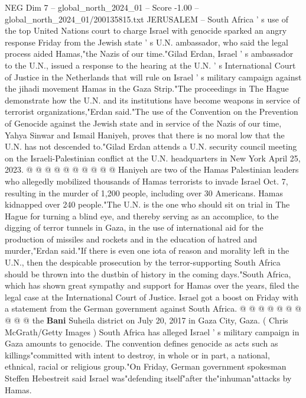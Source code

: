 \begin{textsample}{NEG Dim 7 – global\_north\_2024\_01 – Score -1.00 – global\_north\_2024\_01/200135815.txt}  \label{ex:f7_neg_263}
JERUSALEM -- South Africa ' s use of the top United Nations court to charge Israel with genocide sparked an angry response Friday from the Jewish state ' s U.N. ambassador, who said the legal process aided Hamas,"the Nazis of our time."Gilad Erdan, Israel ' s ambassador to the U.N., issued a response to the hearing at the U.N. ' s International Court of Justice in the Netherlands that will rule on Israel ' s military campaign against the jihadi movement Hamas in the Gaza Strip."The proceedings in The Hague demonstrate how the U.N. and its institutions have become weapons in service of terrorist organizations,"Erdan said."The use of the Convention on the Prevention of Genocide against the Jewish state and in service of the Nazis of our time, Yahya Sinwar and Ismail Haniyeh, proves that there is no moral low that the U.N. has not descended to."Gilad Erdan attends a U.N. security council meeting on the Israeli-Palestinian conflict at the U.N. headquarters in New York April 25, 2023. @ @ @ @ @ @ @ @ @ @ Haniyeh are two of the Hamas Palestinian leaders who allegedly mobilized thousands of Hamas terrorists to invade Israel Oct. 7, resulting in the murder of 1,200 people, including over 30 Americans.
Hamas kidnapped over 240 people."The U.N. is the one who should sit on trial in The Hague for turning a blind eye, and thereby serving as an accomplice, to the digging of terror tunnels in Gaza, in the use of international aid for the production of missiles and rockets and in the education of hatred and murder,"Erdan said."If there is even one iota of reason and morality left in the U.N., then the despicable prosecution by the terror-supporting South Africa should be thrown into the dustbin of history in the coming days."South Africa, which has shown great sympathy and support for Hamas over the years, filed the legal case at the International Court of Justice.
Israel got a boost on Friday with a statement from the German government against South Africa. @ @ @ @ @ @ @ @ @ @ the \textbf{Bani} Suheila district on July 20, 2017 in Gaza City, Gaza. ( Chris McGrath/Getty Images ) South Africa has alleged Israel ' s military campaign in Gaza amounts to genocide.
The convention defines genocide as acts such as killings"committed with intent to destroy, in whole or in part, a national, ethnical, racial or religious group."On Friday, German government spokesman Steffen Hebestreit said Israel was"defending itself"after the"inhuman"attacks by Hamas.

\end{textsample}
